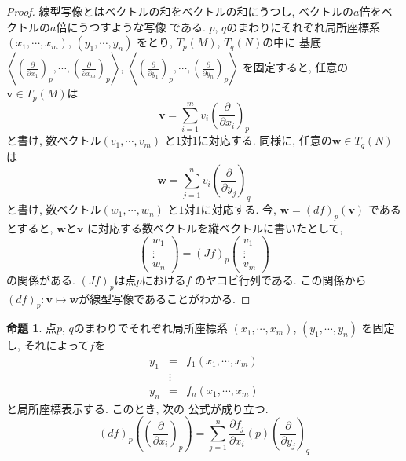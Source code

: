 \documentclass[a4j,12pt]{jarticle}
\theoremstyle{definition}
\newtheorem{proposition}[theorem]{命題}
\begin{document}
\begin{proof}
    線型写像とはベクトルの和をベクトルの和にうつし, 
    ベクトルの$a$倍をベクトルの$a$倍にうつすような写像
    である. 
    $p$, $q$のまわりにそれぞれ局所座標系
    $(x_1,\cdots ,x_m)$, $(y_1,\cdots ,y_n)$
    をとり, $T_p(M)$, $T_q(N)$の中に
    基底$\left< \left(\frac{\partial}
    {\partial x_1}\right)_p,\cdots ,
    \left(\frac{\partial}
    {\partial x_m}\right)_p\right>$, 
    $\left< \left(\frac{\partial}
    {\partial y_1}\right)_p,\cdots ,
    \left(\frac{\partial}
    {\partial y_n}\right)_p\right>$
    を固定すると, 
    任意の$\boldsymbol{v}\in T_p(M)$は
    $$\boldsymbol{v}=
    \sum_{i=1}^{m}v_i
    \left(\frac{\partial}{\partial x_i}
    \right)_p$$
    と書け, 数ベクトル$(v_1,\cdots ,v_m)$
    と$1$対$1$に対応する. 同様に, 
    任意の$\boldsymbol{w}\in T_q(N)$は
    $$\boldsymbol{w}=
    \sum_{j=1}^{n}v_i
    \left(\frac{\partial}{\partial y_j}
    \right)_q$$
    と書け, 数ベクトル$(w_1,\cdots ,w_n)$
    と$1$対$1$に対応する. 今, 
    $\boldsymbol{w}=(df)_p(\boldsymbol{v})$
    であるとすると, 
    $\boldsymbol{w}$と$\boldsymbol{v}$
    に対応する数ベクトルを縦ベクトルに書いたとして, 
    $$\begin{pmatrix}
        w_1\\
        \vdots \\
        w_n
    \end{pmatrix}=(Jf)_p
    \begin{pmatrix}
        v_1\\
        \vdots \\
        v_m
    \end{pmatrix}$$
    の関係がある. $(Jf)_p$は点$p$における$f$
    のヤコビ行列である. この関係から
    $(df)_p:\boldsymbol{v}\mapsto 
    \boldsymbol{w}$が線型写像であることがわかる. 
\end{proof}
\begin{proposition}
    点$p$, $q$のまわりでそれぞれ局所座標系
    $(x_1,\cdots ,x_m)$, $(y_1,\cdots ,y_n)$
    を固定し, それによって$f$を
    \begin{eqnarray*}
        y_1&=&f_1(x_1,\cdots ,x_m)\\
        &\vdots&\\
        y_n&=&f_n(x_1,\cdots ,x_m)
    \end{eqnarray*}
    と局所座標表示する. このとき, 次の
    公式が成り立つ. 
    $$(df)_p\left( \left(
        \frac{\partial}{\partial x_i}
    \right)_p\right)=
    \sum_{j=1}^{n}\frac{\partial f_j}
    {\partial x_i}(p)\left(
        \frac{\partial}{\partial y_j}
    \right)_q$$
\end{proposition}
\end{document}
